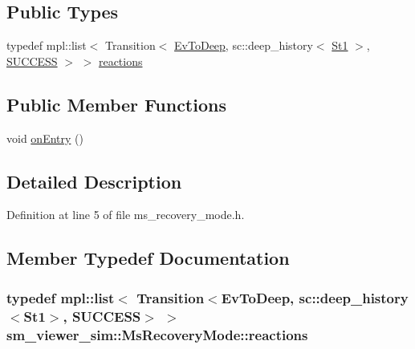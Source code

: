 \subsection*{Public Types}
\begin{DoxyCompactItemize}
\item 
typedef mpl\+::list$<$ Transition$<$ \hyperlink{structsm__viewer__sim_1_1EvToDeep}{Ev\+To\+Deep}, sc\+::deep\+\_\+history$<$ \hyperlink{structsm__viewer__sim_1_1St1}{St1} $>$, \hyperlink{structsmacc_1_1default__transition__tags_1_1SUCCESS}{S\+U\+C\+C\+E\+SS} $>$ $>$ \hyperlink{structsm__viewer__sim_1_1MsRecoveryMode_a0c3d0277e5f9ed412a414c43a70239cf}{reactions}
\end{DoxyCompactItemize}
\subsection*{Public Member Functions}
\begin{DoxyCompactItemize}
\item 
void \hyperlink{structsm__viewer__sim_1_1MsRecoveryMode_ab436ff9e90b963a3339644c0baf223d7}{on\+Entry} ()
\end{DoxyCompactItemize}


\subsection{Detailed Description}


Definition at line 5 of file ms\+\_\+recovery\+\_\+mode.\+h.



\subsection{Member Typedef Documentation}
\subsubsection[{\texorpdfstring{reactions}{reactions}}]{\setlength{\rightskip}{0pt plus 5cm}typedef mpl\+::list$<$ Transition$<${\bf Ev\+To\+Deep}, sc\+::deep\+\_\+history$<${\bf St1}$>$, {\bf S\+U\+C\+C\+E\+SS}$>$ $>$ {\bf sm\+\_\+viewer\+\_\+sim\+::\+Ms\+Recovery\+Mode\+::reactions}}\hypertarget{structsm__viewer__sim_1_1MsRecoveryMode_a0c3d0277e5f9ed412a414c43a70239cf}{}\label{structsm__viewer__sim_1_1MsRecoveryMode_a0c3d0277e5f9ed412a414c43a70239cf}


